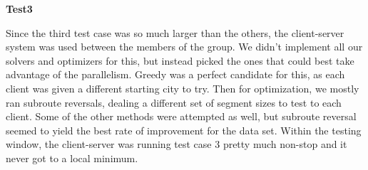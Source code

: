 \documentclass[letterpaper,10pt,titlepage,fleqn]{article}
\begin{document}
\textbf{Test3}

Since the third test case was so much larger than the others, the client-server system was used between the members of the group. We didn’t implement all our solvers and optimizers for this, but instead picked the ones that could best take advantage of the parallelism. Greedy was a perfect candidate for this, as each client was given a different starting city to try. Then for optimization, we mostly ran subroute reversals, dealing a different set of segment sizes to test to each client. Some of the other methods were attempted as well, but subroute reversal seemed to yield the best rate of improvement for the data set. Within the testing window, the client-server was running test case 3 pretty much non-stop and it never got to a local minimum. \\
\end{document}
